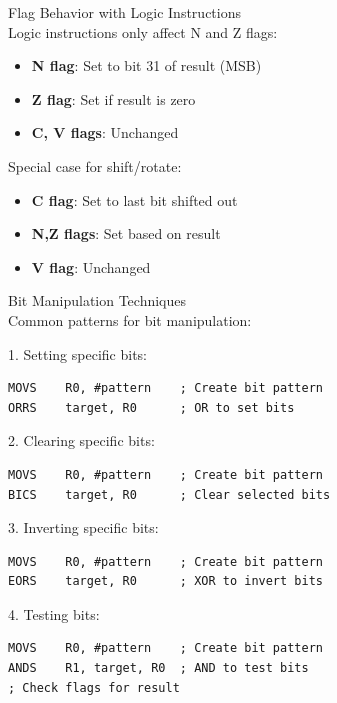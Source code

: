 \begin{concept}{Flag Behavior with Logic Instructions}\\
Logic instructions only affect N and Z flags:
\begin{itemize}
  \item \textbf{N flag}: Set to bit 31 of result (MSB)
  \item \textbf{Z flag}: Set if result is zero
  \item \textbf{C, V flags}: Unchanged
\end{itemize}

Special case for shift/rotate:
\begin{itemize}
  \item \textbf{C flag}: Set to last bit shifted out
  \item \textbf{N,Z flags}: Set based on result
  \item \textbf{V flag}: Unchanged
\end{itemize}
\end{concept}

\begin{KR}{Bit Manipulation Techniques}\\
Common patterns for bit manipulation:

1. Setting specific bits:
\begin{lstlisting}[language=armasm, style=basesmol]
MOVS    R0, #pattern    ; Create bit pattern
ORRS    target, R0      ; OR to set bits
\end{lstlisting}

2. Clearing specific bits:
\begin{lstlisting}[language=armasm, style=basesmol]
MOVS    R0, #pattern    ; Create bit pattern
BICS    target, R0      ; Clear selected bits
\end{lstlisting}

3. Inverting specific bits:
\begin{lstlisting}[language=armasm, style=basesmol]
MOVS    R0, #pattern    ; Create bit pattern
EORS    target, R0      ; XOR to invert bits
\end{lstlisting}

4. Testing bits:
\begin{lstlisting}[language=armasm, style=basesmol]
MOVS    R0, #pattern    ; Create bit pattern
ANDS    R1, target, R0  ; AND to test bits
; Check flags for result
\end{lstlisting}
\end{KR}

